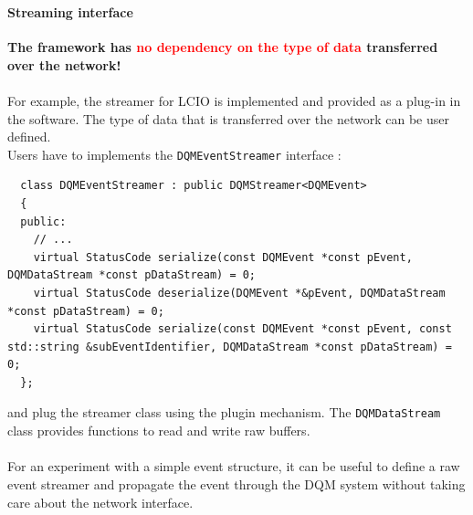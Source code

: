 \documentclass[8pt]{beamer}
\begin{document}
    
    
    
    \begin{frame}[containsverbatim]
    \frametitle{\secname}
    \framesubtitle{Streaming interface}

      \textbf{The framework has \textcolor{red}{no dependency on the type of data} transferred over the network!} \\
      ~ \\
      For example, the streamer for LCIO is implemented and provided as a plug-in in the software. The type of data that is transferred over the network can be user defined. \\
      Users have to implements the \verb|DQMEventStreamer| interface : \\

  \begin{lstlisting}
  class DQMEventStreamer : public DQMStreamer<DQMEvent>
  {
  public:
    // ...
    virtual StatusCode serialize(const DQMEvent *const pEvent, DQMDataStream *const pDataStream) = 0;
    virtual StatusCode deserialize(DQMEvent *&pEvent, DQMDataStream *const pDataStream) = 0;
    virtual StatusCode serialize(const DQMEvent *const pEvent, const std::string &subEventIdentifier, DQMDataStream *const pDataStream) = 0;
  };
  \end{lstlisting}
  
  and plug the streamer class using the plugin mechanism. The \verb|DQMDataStream| class provides functions to read and write raw buffers. \\
  ~ \\
  For an experiment with a simple event structure, it can be useful to define a raw event streamer and propagate the event through the DQM system without taking care about the network interface. \\
    \end{frame}
    
\end{document}
